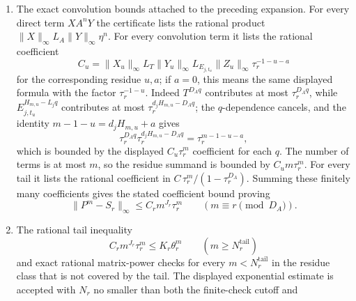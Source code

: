 \begin{theorem}
\begin{enumerate}[label=\textup{(\roman*)}]
    inversion over \(\QQ\). For the first finite convolution, the
    verifier further splits \(\ell=u+D_Aq\). If the recurrent factor in
    that residue has length \(m-1-\ell=d_jh+a\), with
    \(0\le a<d_j\), then
    \[
      h=H_{m,u}-L_jq,\qquad
      L_j:=D_A/d_j,\qquad
      H_{m,u}:=(m-1-u-a)/d_j .
    \]
    The integer \(a\) is fixed by the listed residue class, so
    \(H_{m,u}\) is integral and the return-error exponent decreases as
    \(q\) increases. The certificate records only the terms with
    \(H_{m,u}-L_jq\ge1\); the finitely many smaller recurrent exponents
    are moved to the direct finite-check list. The resulting finite
    residue list is
    \[
      \sum_{q=0}^{Q(m,u)}
        X_{u}T^{D_Aq}Y_{u}E_{j,t_u}^{H_{m,u}-L_jq}Z_{u},
    \]
    with all matrices \(X_u,Y_u,Z_u\) rational. This is the normal form
    for every convolution term.
    \item The exact convolution bounds attached to the preceding
    expansion. For every direct term \(X A^nY\) the certificate lists
    the rational product
    \(\|X\|_\infty L_A\|Y\|_\infty\eta^n\). For every convolution term
    it lists the rational coefficient
    \[
      C_u=\|X_u\|_\infty L_T\|Y_u\|_\infty
        L_{E_{j,t_u}}\|Z_u\|_\infty\tau_r^{-1-u-a}
    \]
    for the corresponding residue \(u,a\); if \(a=0\), this means the
    same displayed formula with the factor \(\tau_r^{-1-u}\). Indeed
    \(T^{D_Aq}\) contributes at most \(\tau_r^{D_Aq}\), while
    \(E_{j,t_u}^{H_{m,u}-L_jq}\) contributes at most
    \(\tau_r^{d_jH_{m,u}-D_Aq}\); the \(q\)-dependence cancels, and the
    identity \(m-1-u=d_jH_{m,u}+a\) gives
    \[
      \tau_r^{D_Aq}\tau_r^{d_jH_{m,u}-D_Aq}
      =\tau_r^{m-1-u-a},
    \]
    which is bounded by the displayed \(C_u\tau_r^m\) coefficient for
    each \(q\). The number of terms is at most \(m\),
    so the residue summand is bounded by \(C_um\tau_r^m\). For every
    tail it lists the
    rational coefficient in
    \(C\,\tau_r^m/(1-\tau_r^{D_A})\). Summing these finitely many
    coefficients gives the stated coefficient bound
    proving
    \[
      \|P^m-S_r\|_\infty\le C_rm^{J_r}\tau_r^m
      \qquad(m\equiv r\pmod {D_A}).
    \]
    \item The rational tail inequality
    \[
      C_rm^{J_r}\tau_r^m\le K_r\theta_r^m
      \qquad(m\ge N_r^{\mathrm{tail}})
    \]
    and exact rational matrix-power checks for every
    \(m<N_r^{\mathrm{tail}}\) in the residue class that is not covered
    by the tail. The displayed exponential estimate is accepted with
    \(N_r\) no smaller than both the finite-check cutoff and

\end{enumerate}
\end{theorem}
